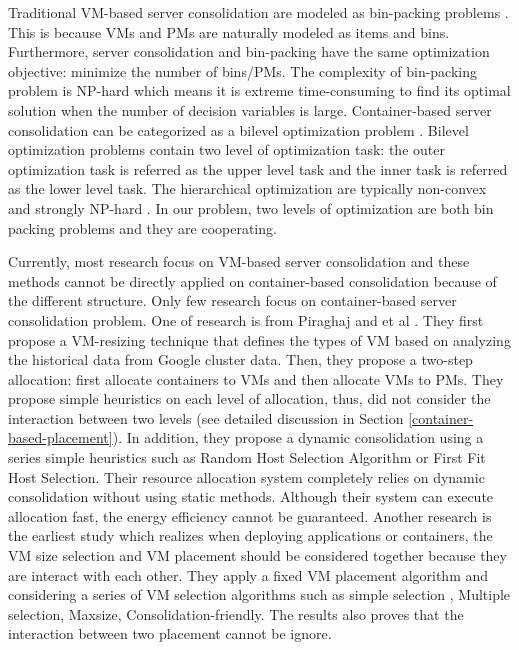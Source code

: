 Traditional VM-based server consolidation are modeled as bin-packing problems \cite{Mann:2015ua}. This is because VMs and PMs are naturally modeled as items and bins. Furthermore, server consolidation and bin-packing have the same optimization objective: minimize the number of bins/PMs. The complexity of bin-packing problem is NP-hard which means it is extreme time-consuming to find its optimal solution when the number of decision variables is large. Container-based server consolidation can be categorized as a bilevel optimization problem \cite{Colson:2007bu}. Bilevel optimization problems contain two level of optimization task: the outer optimization task is referred as the upper level task and the inner task is referred as the lower level task. The hierarchical optimization are typically non-convex and strongly NP-hard \cite{Vicente:1994ie}. In our problem, two levels of optimization are both bin packing problems and they are cooperating.

Currently, most research focus on VM-based server consolidation and these methods cannot be directly applied on container-based consolidation because of the different structure. Only few research focus on container-based server consolidation problem. One of  research is from Piraghaj and et al \cite{Piraghaj:2015uf}. They first propose a VM-resizing technique that defines the types of VM based on analyzing the historical data from Google cluster data. Then, they propose a two-step allocation: first allocate containers to VMs and then allocate VMs to PMs. They propose simple heuristics on each level of allocation, thus, did not consider the interaction between two levels (see detailed discussion in Section \ref{container-based-placement}). In addition, they propose a dynamic consolidation \cite{Piraghaj:2016bw} using a series simple heuristics such as Random Host Selection Algorithm or First Fit Host Selection. 
Their resource allocation system completely relies on dynamic consolidation without using static methods. Although their system can execute allocation fast, the energy efficiency cannot be guaranteed. Another research  \cite{Mann:2016hx} is the earliest study which realizes when deploying applications or containers, the VM size selection and VM placement should be considered together because they are interact with each other. They apply a fixed VM placement algorithm and considering a series of VM selection algorithms such as simple selection \cite{Ganesan:2012eb},  Multiple selection, Maxsize, Consolidation-friendly. The results also proves that the interaction between two placement cannot be ignore.

